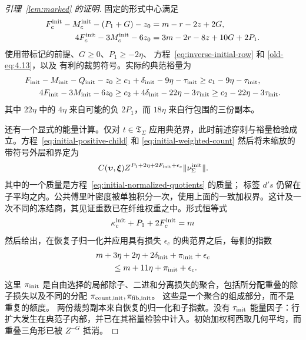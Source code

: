 \documentclass[11pt,a4paper]{article}
\numberwithin{equation}{section}
\numberwithin{figure}{section}
\theoremstyle{definition}
\theoremstyle{remark}
\begin{document}
\begin{proof}[引理~\ref{lem:marked} 的证明]
固定的形式中心满足
\[
 \begin{aligned}
 F_c^{\rm init}-M_c^{\rm init}-(P_1+G)-z_0&=m-r-2z+2G,\\
 4F_c^{\rm init}-3M_c^{\rm init}-6z_0&=3m-2r-8z+10G+2P_1.
 \end{aligned}
\]
使用带标记的前提、\(G\ge0\)、\(P_1\ge-2\eta\)、
方程~\eqref{eq:inverse-initial-row} 和 \eqref{old-eq:4.13}，以及
有利的裁剪符号。实际的典范裕量为
\begin{equation}\label{eq:inverse-initial-margins}
 \begin{aligned}
 F_{\rm init}-M_{\rm init}-Q_{\rm init}-z_0
   &\ge c_1+\delta_{\rm init}-9\eta-\tau_{\rm init}
     \ge c_1-9\eta-\tau_{\rm init},\\
 4F_{\rm init}-3M_{\rm init}-6z_0
   &\ge c_2+4\delta_{\rm init}-22\eta-3\tau_{\rm init}
     \ge c_2-22\eta-3\tau_{\rm init}.
 \end{aligned}
\end{equation}
其中 \(22\eta\) 中的 \(4\eta\) 来自可能的负 \(2P_1\)，而
\(18\eta\) 来自行包围的三份副本。

还有一个显式的能量计算。仅对 \(t\in\mathfrak T_\Sigma\) 应用典范界，此时前述穿刺与裕量检验成立。方程~\eqref{eq:initial-positive-child}
和 \eqref{eq:initial-weighted-count} 然后将未缩放的带符号外层和界定为
\[
 C(\boldsymbol\upsilon,\boldsymbol\xi)
 Z^{P_1+2\eta+2F_{\rm init}+\epsilon_c}
 \|\nu_\Sigma^{\rm init}\|.
\]
其中的一个质量是方程~\eqref{eq:initial-normalized-quotients} 的质量；
标签 \(d's\) 仍留在子平均之内。公共傅里叶密度被单独积分一次，使用上面的一致加权界。这计及一次不同的冻结商，其见证重数已在纤维权重之中。形式恒等式
\[
 \kappa_c^{\rm init}+P_1+2F_c^{\rm init}=m
\]
然后给出，在恢复子归一化并应用具有损失 \(\epsilon_c\) 的典范界之后，每侧的指数
\begin{equation}\label{eq:inverse-initial-energy}
 \begin{split}
 &m+3\eta+2\eta+2\delta_{\rm init}+\pi_{\rm init}+\epsilon_c\\
 &\qquad\le m+11\eta+\pi_{\rm init}+\epsilon_c.
 \end{split}
\end{equation}
这里 \(\pi_{\rm init}\) 是自由选择的局部除子、二进和分离损失的聚合，包括所分配重叠的除子损失以及不同的分配
\(\pi_{{\rm count},{\rm init}},\pi_{{\rm fib},{\rm init}}\)。
这些是一个聚合的组成部分，而不是重复的额度。
两份裁剪副本来自恢复的归一化和子指数。没有 \(\tau_{\rm init}\) 能量因子：行扩大发生在典范子内部，并已在其裕量检验中计入。初始加权柯西取几何平均，而重叠三角形已被 \(Z^{-G}\) 抵消。


\end{proof}
\end{document}
